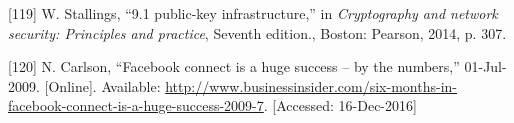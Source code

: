 \documentclass[12pt,english,a4paper,titlepage,cleardoublepage=empty,dottedtoc]{report}
\begin{document}
\hypertarget{ref-book_2014_chapter-10-5-asym-random-number-gen}{}
{[}119{]} W. Stallings, ``9.1 public-key infrastructure,'' in
\emph{Cryptography and network security: Principles and practice},
Seventh edition., Boston: Pearson, 2014, p. 307.

\hypertarget{ref-web_2009-success-of-facebook-connect}{}
{[}120{]} N. Carlson, ``Facebook connect is a huge success -- by the
numbers,'' 01-Jul-2009. {[}Online{]}. Available:
\url{http://www.businessinsider.com/six-months-in-facebook-connect-is-a-huge-success-2009-7}.
{[}Accessed: 16-Dec-2016{]}
\end{document}
